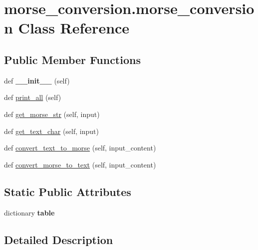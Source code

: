 \hypertarget{classmorse__conversion_1_1morse__conversion}{}\section{morse\+\_\+conversion.\+morse\+\_\+conversion Class Reference}
\label{classmorse__conversion_1_1morse__conversion}
\subsection*{Public Member Functions}
\begin{DoxyCompactItemize}
\item 
\mbox{\label{classmorse__conversion_1_1morse__conversion_a590bac0d36848811591a35b4bd4ec25a}} 
def {\bfseries \+\_\+\+\_\+init\+\_\+\+\_\+} (self)
\item 
def \mbox{\hyperlink{classmorse__conversion_1_1morse__conversion_acb139db386ca7b823adc40921c9f70bc}{print\+\_\+all}} (self)
\item 
def \mbox{\hyperlink{classmorse__conversion_1_1morse__conversion_a47073274e46c3a138d46f0163a413582}{get\+\_\+morse\+\_\+str}} (self, input)
\item 
def \mbox{\hyperlink{classmorse__conversion_1_1morse__conversion_abd07297a2f20d9c74a9b5c15f37fbe4f}{get\+\_\+text\+\_\+char}} (self, input)
\item 
def \mbox{\hyperlink{classmorse__conversion_1_1morse__conversion_a9c761654a08464e7308dc721adb946fb}{convert\+\_\+text\+\_\+to\+\_\+morse}} (self, input\+\_\+content)
\item 
def \mbox{\hyperlink{classmorse__conversion_1_1morse__conversion_a541fbc681012d7974aba16a1a1460bc2}{convert\+\_\+morse\+\_\+to\+\_\+text}} (self, input\+\_\+content)
\end{DoxyCompactItemize}
\subsection*{Static Public Attributes}
\begin{DoxyCompactItemize}
\item 
dictionary {\bfseries table}
\end{DoxyCompactItemize}


\subsection{Detailed Description}


